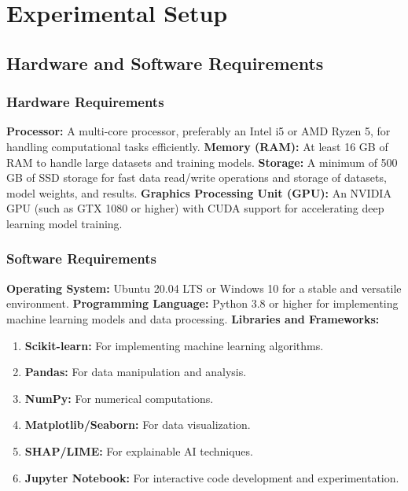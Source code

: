 \documentclass[a4paper,12pt]{report}
\begin{document}
\chapter{Experimental Setup}

\section{Hardware and Software Requirements}

\subsection{Hardware Requirements}

    \textbf{Processor:} A multi-core processor, preferably an Intel i5 or AMD Ryzen 5, for handling computational tasks efficiently.
    \newline \textbf{Memory (RAM):} At least 16 GB of RAM to handle large datasets and training models.
    \newline\textbf{Storage:} A minimum of 500 GB of SSD storage for fast data read/write operations and storage of datasets, model weights, and results.
    \newline \textbf{Graphics Processing Unit (GPU):} An NVIDIA GPU (such as GTX 1080 or higher) with CUDA support for accelerating deep learning model training.

\subsection{Software Requirements}
   \textbf{Operating System:} Ubuntu 20.04 LTS or Windows 10 for a stable and versatile environment.
    \newline \textbf{Programming Language:} Python 3.8 or higher for implementing machine learning models and data processing.
   \newline\textbf{Libraries and Frameworks:}
    \begin{enumerate}
        \item \textbf{Scikit-learn:} For implementing machine learning algorithms.
        \item \textbf{Pandas:} For data manipulation and analysis.
        \item \textbf{NumPy:} For numerical computations.
        \item \textbf{Matplotlib/Seaborn:} For data visualization.
        \item \textbf{SHAP/LIME:} For explainable AI techniques.
        \item \textbf{Jupyter Notebook:} For interactive code development and experimentation.
    \end{enumerate}
\end{document}
